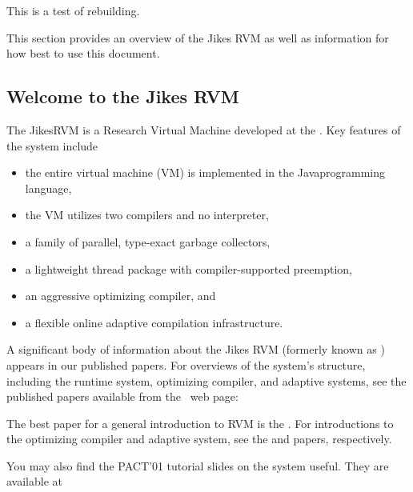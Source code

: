 This is a test of rebuilding.

This section provides an overview of the Jikes RVM as well as
information for how best to use this document.

\subsection{Welcome to the Jikes RVM}

The Jikes\JikesTMFootnote RVM is a Research Virtual Machine 
 developed at the 
.  Key
features of the system include
\begin{itemize}
\item the entire virtual machine (VM) is implemented in the
  Java\JavaTMFootnote  programming language,
\item the VM utilizes two compilers and no interpreter,
\item a family of parallel, type-exact garbage collectors,
\item a lightweight thread package with compiler-supported preemption,
\item an aggressive optimizing compiler, and 
\item a flexible online adaptive compilation infrastructure.
\end{itemize}

A significant body of information about the Jikes RVM 
(formerly known as 
\xlink{\jp}{\JalapenoHomeURL}) appears 
in our published
papers.  For overviews of the system's structure, including the runtime system,
optimizing compiler, and adaptive systems, see the published papers
available from the \jrvm\ web page:
\begin{quote}
\xlink{{\RVMPubsURL}}{\RVMPubsURL}
\end{quote}

The best paper for a general introduction to RVM is 
the 
.  
For introductions to the
optimizing compiler and adaptive system, see the 
{\JavaGrandePaperURL}
 and 
{\OOPSLAPaperURL}  
papers, respectively.

You may also find the PACT'01 tutorial slides on the system useful.
They are available at
\begin{quote}
\xlink{{\RVMSlidesURL}}{\RVMSlidesURL}
\end{quote}

